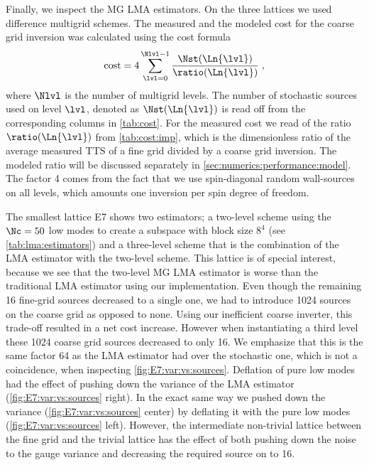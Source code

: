 Finally, we inspect the MG LMA estimators.
On the three lattices we used difference multigrid schemes.
The measured and the modeled cost for the coarse grid inversion was calculated using the cost formula
\begin{equation} \label{eq:numerics:cost}
\text{cost} = 4 \sum_{\lvl = 0}^{\Nlvl -1} \frac{\Nst(\Ln{\lvl})}{\ratio(\Ln{\lvl})} \;,
\end{equation}
where $\Nlvl$ is the number of multigrid levels.
The number of stochastic sources used on level $\lvl$, denoted as $\Nst(\Ln{\lvl})$ is read off from the corresponding columns in \cref{tab:cost}.
For the measured cost we read of the ratio $\ratio(\Ln{\lvl})$ from \cref{tab:cost:imp}, which is the dimensionless ratio of the average measured TTS of a fine grid divided by a coarse grid inversion.
The modeled ratio will be discussed separately in \cref{sec:numerics:performance:model}.
The factor \num{4} comes from the fact that we use spin-diagonal random wall-sources on all levels, which amounts one inversion per spin degree of freedom.

The smallest lattice E7 shows two estimators; a two-level scheme using the $\Nc=50$ low modes to create a subspace with block size $8^4$ (see \cref{tab:lma:estimators}) and a three-level scheme that is the combination of the LMA estimator with the two-level scheme.
This lattice is of special interest, because we see that the two-level MG LMA estimator is worse than the traditional LMA estimator using our implementation.
Even though the remaining \num{16} fine-grid sources decreased to a single one, we had to introduce \num{1024} sources on the coarse grid as opposed to none.
Using our inefficient coarse inverter, this trade-off resulted in a net cost increase.
However when instantiating a third level these \num{1024} coarse grid sources decreased to only \num{16}.
We emphasize that this is the same factor \num{64} as the LMA estimator had over the stochastic one, which is not a coincidence, when inspecting \cref{fig:E7:var:vs:sources}.
Deflation of pure low modes had the effect of pushing down the  variance of the LMA estimator (\cref{fig:E7:var:vs:sources} right).
In the exact same way we pushed down the  variance (\cref{fig:E7:var:vs:sources} center) by deflating it with the pure low modes (\cref{fig:E7:var:vs:sources} left).
However, the intermediate non-trivial lattice between the fine grid and the trivial lattice has the effect of both pushing down the  noise to the gauge variance and decreasing the required source on  to \num{16}.

